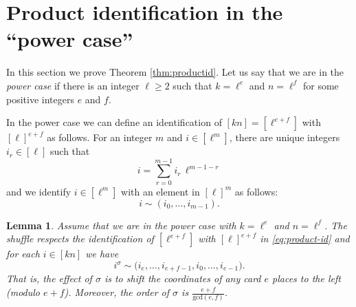 \documentclass[12pt]{amsart}
\newtheorem{lem}[thm]{Lemma}
\theoremstyle{remark}
\theoremstyle{definition}
\begin{document}
\section{Product identification in the ``power case''} \label{sec:productid}

In this section we prove Theorem \ref{thm:productid}.
%
Let us say that we are in the \emph{power case} if there is an integer $\ell \geqslant 2$ such that $k = \ell^e$ and $n = \ell^f$ for some positive integers $e$ and $f$.

In the power case we can define an identification of $[kn]=[\ell^{e+f}]$ with $[\ell]^{e+f}$ as follows. For an integer $m$ and  $i \in [\ell^m]$, there are unique integers $ i_r \in [\ell]$ such that 
	\begin{equation} \label{eq:base-l}
	i = \sum_{r=0}^{m-1} i_r\,\ell^{m-1-r }
	\end{equation}
 and we   identify $i\in [\ell^m]$ with an element in $[\ell]^m$ as follows:
	\begin{equation} \label{eq:product-id}
	i \sim (i_0,\dots,i_{m-1}).
	\end{equation}

\begin{lem} \label{lem:pa-shuffle}
Assume that we are in the power case with $k = \ell^e$ and $n = \ell^f$.
The shuffle respects the identification of $[\ell^{e+f}]$ with $[\ell]^{e+f}$ in \eqref{eq:product-id} and for each $i\in [kn]$ we have
	\[ i^\sigma \sim \big(i_e, \ldots, i_{e+f-1}, i_0, \ldots, i_{e-1}\big). \]
That is, the effect of $\sigma$ is to shift the coordinates of any card $e$ places to the left (modulo $e+f$). Moreover, the order of $\sigma$ is $\frac{e+f}{\mathrm{gcd}(e,f)}$.
\end{lem}
\end{document}
